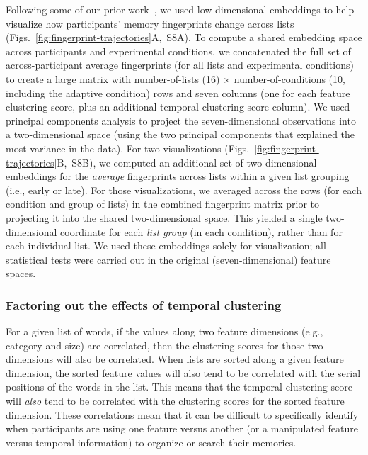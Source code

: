 \documentclass[11pt]{article}
\newcommand{\fingerprintTrajectoryRandom}{S8}
\begin{document}
Following some of our prior work~\citep{FitzEtal23, HeusEtal18a, HeusEtal21, MannEtal22},
we used low-dimensional embeddings to help visualize how participants' memory
fingerprints change across lists
(Figs.~\ref{fig:fingerprint-trajectories}A,~\fingerprintTrajectoryRandom A). To
compute a shared embedding space across participants and experimental
conditions, we concatenated the full set of across-participant average
fingerprints (for all lists and experimental conditions) to create a large
matrix with number-of-lists (16) $\times$ number-of-conditions (10, including
the adaptive condition) rows and seven columns (one for each feature clustering
score, plus an additional temporal clustering score column). We used principal
components analysis to project the seven-dimensional observations into a
two-dimensional space (using the two principal components that explained the
most variance in the data). For two visualizations
(Figs.~\ref{fig:fingerprint-trajectories}B,~\fingerprintTrajectoryRandom B),
we computed an additional set of two-dimensional embeddings for the
\textit{average} fingerprints across lists within a given list grouping (i.e.,
early or late). For those visualizations, we averaged across the rows (for each
condition and group of lists) in the combined fingerprint matrix prior to
projecting it into the shared two-dimensional space. This yielded a single
two-dimensional coordinate for each \textit{list group} (in each condition),
rather than for each individual list. We used these embeddings solely for
visualization; all statistical tests were carried out in the original
(seven-dimensional) feature spaces.

\subsubsection*{Factoring out the effects of temporal clustering}

For a given list of words, if the values along two feature dimensions (e.g.,
category and size) are correlated, then the clustering scores for those two
dimensions will also be correlated. When lists are sorted along a given feature
dimension, the sorted feature values will also tend to be correlated with the
serial positions of the words in the list. This means that the temporal
clustering score will \textit{also} tend to be correlated with the clustering
scores for the sorted feature dimension. These correlations mean that it can be
difficult to specifically identify when participants are using one feature
versus another (or a manipulated feature versus temporal information) to
organize or search their memories.
\end{document}
